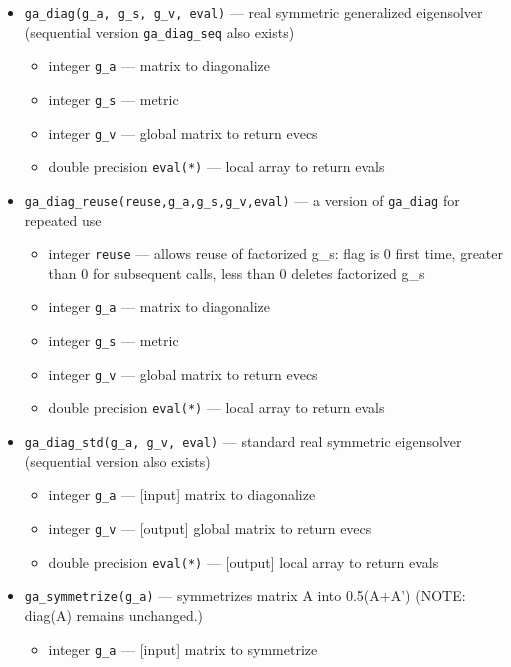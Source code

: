 \begin{itemize}
\item {\tt ga\_diag(g\_a, g\_s, g\_v, eval)} --- real symmetric generalized eigensolver
  (sequential version \verb+ga_diag_seq+ also exists)
\begin{itemize}
\item      integer {\tt g\_a}           ---  matrix to diagonalize
\item      integer {\tt g\_s}           ---  metric
\item      integer {\tt g\_v}           ---  global matrix to return evecs
\item      double precision {\tt eval(*)} --- local array to return evals
\end{itemize}

\item {\tt ga\_diag\_reuse(reuse,g\_a,g\_s,g\_v,eval)} --- a 
version of {\tt ga\_diag} for repeated use
\begin{itemize}
\item      integer {\tt reuse} --- allows reuse of factorized g\_s: flag is
                                     0  first time, greater than 0 for
                                        subsequent calls, less than 0 
                                     deletes factorized g\_s 
\item      integer {\tt g\_a}           ---  matrix to diagonalize
\item      integer {\tt g\_s}           ---  metric
\item      integer {\tt g\_v}           ---  global matrix to return evecs
\item      double precision {\tt eval(*)} --- local array to return evals
\end{itemize}

\item {\tt ga\_diag\_std(g\_a, g\_v, eval)} --- standard real symmetric eigensolver
  (sequential version also exists)
\begin{itemize}
\item      integer {\tt g\_a}            --- [input] matrix to diagonalize
\item      integer {\tt g\_v}            --- [output] global matrix to return evecs
\item      double precision {\tt eval(*)} --- [output] local array to return evals
\end{itemize}

\item {\tt ga\_symmetrize(g\_a)} --- symmetrizes matrix A into 0.5(A+A') (NOTE: diag(A)
remains unchanged.)
\begin{itemize}
\item      integer {\tt g\_a}           --- [input] matrix to symmetrize
\end{itemize}


\end{itemize}
